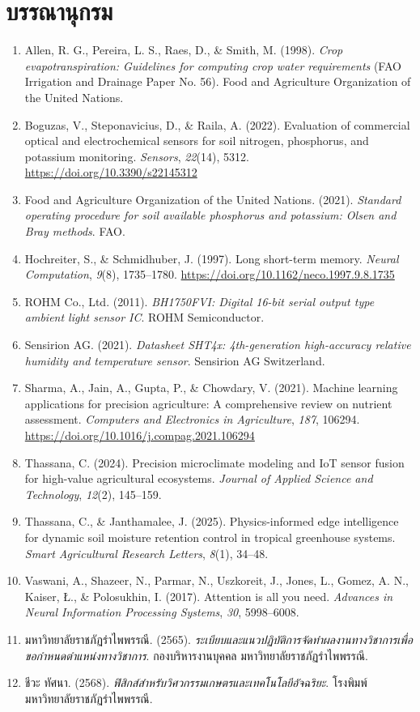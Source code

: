 \chapter*{บรรณานุกรม}

\begin{enumerate}[leftmargin=1.5em, itemsep=6pt]
    \item Allen, R. G., Pereira, L. S., Raes, D., \& Smith, M. (1998). \textit{Crop evapotranspiration: Guidelines for computing crop water requirements} (FAO Irrigation and Drainage Paper No. 56). Food and Agriculture Organization of the United Nations.
    \item Boguzas, V., Steponavicius, D., \& Raila, A. (2022). Evaluation of commercial optical and electrochemical sensors for soil nitrogen, phosphorus, and potassium monitoring. \textit{Sensors}, \textit{22}(14), 5312. \url{https://doi.org/10.3390/s22145312}
    \item Food and Agriculture Organization of the United Nations. (2021). \textit{Standard operating procedure for soil available phosphorus and potassium: Olsen and Bray methods}. FAO.
    \item Hochreiter, S., \& Schmidhuber, J. (1997). Long short-term memory. \textit{Neural Computation}, \textit{9}(8), 1735--1780. \url{https://doi.org/10.1162/neco.1997.9.8.1735}
    \item ROHM Co., Ltd. (2011). \textit{BH1750FVI: Digital 16-bit serial output type ambient light sensor IC}. ROHM Semiconductor.
    \item Sensirion AG. (2021). \textit{Datasheet SHT4x: 4th-generation high-accuracy relative humidity and temperature sensor}. Sensirion AG Switzerland.
    \item Sharma, A., Jain, A., Gupta, P., \& Chowdary, V. (2021). Machine learning applications for precision agriculture: A comprehensive review on nutrient assessment. \textit{Computers and Electronics in Agriculture}, \textit{187}, 106294. \url{https://doi.org/10.1016/j.compag.2021.106294}
    \item Thassana, C. (2024). Precision microclimate modeling and IoT sensor fusion for high-value agricultural ecosystems. \textit{Journal of Applied Science and Technology}, \textit{12}(2), 145--159.
    \item Thassana, C., \& Janthamalee, J. (2025). Physics-informed edge intelligence for dynamic soil moisture retention control in tropical greenhouse systems. \textit{Smart Agricultural Research Letters}, \textit{8}(1), 34--48.
    \item Vaswani, A., Shazeer, N., Parmar, N., Uszkoreit, J., Jones, L., Gomez, A. N., Kaiser, Ł., \& Polosukhin, I. (2017). Attention is all you need. \textit{Advances in Neural Information Processing Systems}, \textit{30}, 5998--6008.
    \item มหาวิทยาลัยราชภัฏรำไพพรรณี. (2565). \textit{ระเบียบและแนวปฏิบัติการจัดทำผลงานทางวิชาการเพื่อขอกำหนดตำแหน่งทางวิชาการ}. กองบริหารงานบุคคล มหาวิทยาลัยราชภัฏรำไพพรรณี.
    \item ชีวะ ทัศนา. (2568). \textit{ฟิสิกส์สำหรับวิศวกรรมเกษตรและเทคโนโลยีอัจฉริยะ}. โรงพิมพ์มหาวิทยาลัยราชภัฏรำไพพรรณี.
\end{enumerate}
\cleardoublepage
